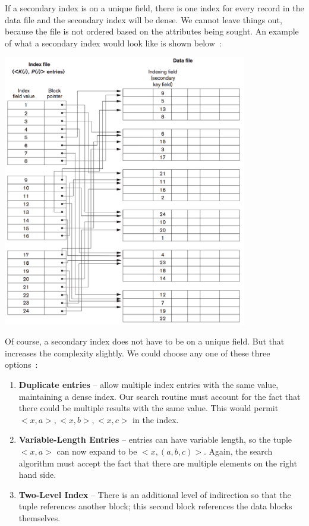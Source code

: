 If a secondary index is on a unique field, there is one index for every record in the data file and the secondary index will be dense. We cannot leave things out, because the file is not ordered based on the attributes being sought. An example of what a secondary index would look like is shown below~\cite{fds}:

\begin{center}
\includegraphics[width=0.8\textwidth]{images/secondary-index}
\end{center}

Of course, a secondary index does not have to be on a unique field. But that increases the complexity slightly. We could choose any one of these three options~\cite{fds}:

\begin{enumerate}
	\item \textbf{Duplicate entries} -- allow multiple index entries with the same value, maintaining a dense index. Our search routine must account for the fact that there could be multiple results with the same value. This would permit $<x, a>, <x, b>, <x, c>$ in the index.
	\item \textbf{Variable-Length Entries} -- entries can have variable length, so the tuple $<x, a>$ can now expand to be $<x, (a, b, c)>$. Again, the search algorithm must accept the fact that there are multiple elements on the right hand side.
	\item \textbf{Two-Level Index} -- There is an additional level of indirection so that the tuple references another block; this second block references the data blocks themselves.
\end{enumerate}

